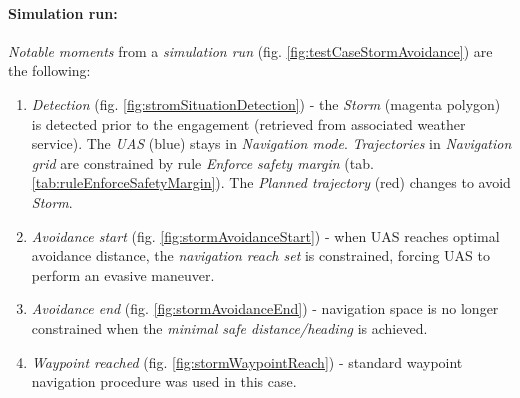     \paragraph{Simulation run:} \emph{Notable moments} from a \emph{simulation run} (fig. \ref{fig:testCaseStormAvoidance}) are the following:
    \begin{enumerate}
    
        \item \emph{Detection} (fig. \ref{fig:stromSituationDetection}) - the \emph{Storm} (magenta polygon) is detected prior to the engagement (retrieved from associated weather service). The \emph{UAS} (blue) stays in \emph{Navigation mode}. \emph{Trajectories} in \emph{Navigation grid} are constrained by rule \emph{Enforce safety margin} (tab. \ref{tab:ruleEnforceSafetyMargin}). The \emph{Planned trajectory} (red) changes to avoid \emph{Storm}.
        
        \item \emph{Avoidance start} (fig. \ref{fig:stormAvoidanceStart}) - when UAS reaches optimal avoidance distance, the \emph{navigation reach set} is constrained, forcing UAS to perform an evasive maneuver.
        
        \item \emph{Avoidance end} (fig. \ref{fig:stormAvoidanceEnd}) - navigation space is no longer constrained when the \emph{minimal safe distance/heading} is achieved.
        
        \item \emph{Waypoint reached} (fig. \ref{fig:stormWaypointReach}) - standard waypoint navigation procedure was used in this case.
        
    \end{enumerate}
        
